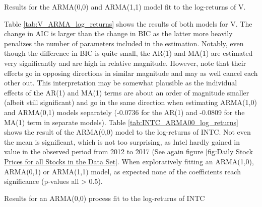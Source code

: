 \begin{table}[h!]
    \centering
    \vspace{-2ex}
    \small
    
    \vspace{1ex}
    
    \vspace{-2ex}
    \small
    
    \vspace{-2ex}
    \caption{Results for the ARMA(0,0) and ARMA(1,1) model fit to the log-returns of V.}
    \label{tab:V_ARMA_log_returns}
\end{table}

Table \ref{tab:V_ARMA_log_returns} shows the results of both models for V. The change in AIC is larger than the change in BIC as the latter more heavily penalizes the number of parameters included in the estimation. Notably, even though the difference in BIC is quite small, the AR(1) and MA(1) are estimated very significantly and are high in relative magnitude. However, note that their effects go in opposing directions in similar magnitude and may as well cancel each other out. This interpretation may be somewhat plausible as the individual effects of the AR(1) and MA(1) terms are about an order of magnitude smaller (albeit still significant) and go in the same direction when estimating ARMA(1,0) and ARMA(0,1) models separately (-0.0736 for the AR(1) and -0.0809 for the MA(1) term in separate models). 
Table \ref{tab:INTC_ARMA00_log_returns} shows the result of the ARMA(0,0) model to the log-returns of INTC. Not even the mean is significant, which is not too surprising, as Intel hardly gained in value in the observed period from 2012 to 2017 (See again figure \ref{fig:Daily Stock Prices for all Stocks in the Data Set}. When exploratively fitting an ARMA(1,0), ARMA(0,1) or ARMA(1,1) model, as expected none of the coefficients reach significance (p-values all > 0.5). 

\begin{table}[h!]
    \centering
    \vspace{-2ex}
    \small
    
    \caption{Results for an ARMA(0,0) process fit to the log-returns of INTC}
    \vspace{-2ex}
    \label{tab:INTC_ARMA00_log_returns}
\end{table}{}

